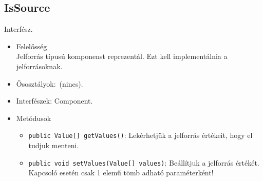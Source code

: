 \subsection{IsSource}
Interfész.
\begin{itemize}
\item Felelősség\\
Jelforrás típusú komponenst reprezentál. Ezt kell implementálnia a jelforrásoknak.
\item Ősosztályok:\ (nincs).
\item Interfészek: Component.
\item Metódusok$\ $
\begin{itemize}
	\item \texttt{public Value[] getValues()}: Lekérhetjük a jelforrás értékeit, hogy el tudjuk menteni.
	\item \texttt{public void setValues(Value[] values)}: Beállítjuk a jelforrás értékét. Kapcsoló esetén csak 1 elemű tömb  adható paraméterként!
\end{itemize}
\end{itemize}

